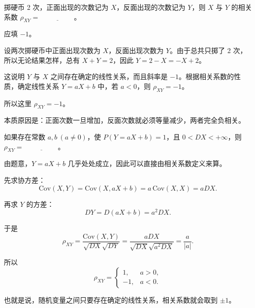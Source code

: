 ﻿\documentclass[lang=cn,11pt]{elegantbook}
\begin{document}
\begin{exercise}\label{exer:4-coin-rho}
掷硬币 2 次，正面出现的次数记为 \(X\)，反面出现的次数记为 \(Y\)，则 \(X\) 与 \(Y\) 的相关系数 \(\rho_{XY} =\,\underline{\hspace{2cm}}\)。
\end{exercise}
\begin{solution}
应填 \(-1\)。

设两次掷硬币中正面出现次数为 \(X\)，反面出现次数为 \(Y\)。由于总共只掷了 2 次，所以无论结果怎样，总有 \(X+Y=2\)，因此 \(Y=2-X=-X+2\)。

这说明 \(Y\) 与 \(X\) 之间存在确定的线性关系，而且斜率是 \(-1\)。根据相关系数的性质，确定线性关系 \(Y=aX+b\) 中，若 \(a<0\)，则 \(\rho_{XY}=-1\)。

所以这里 \(\rho_{XY}=-1\)。

本质原因是：正面次数一旦增加，反面次数就必须等量减少，两者完全负相关。
\end{solution}


\begin{exercise}\label{exer:4-14-linear}
如果存在常数 \(a, b\ (a \neq 0)\)，使 \(P(Y = aX + b) = 1\)，且 \(0 < DX < +\infty\)，则 \(\rho_{XY} =\,\underline{\hspace{2cm}}\)。
\end{exercise}

\begin{solution}
由题意，\(Y=aX+b\) 几乎处处成立，因此可以直接由相关系数定义来算。

先求协方差：
\[
\mathrm{Cov}(X,Y)=\mathrm{Cov}(X,aX+b)=a\,\mathrm{Cov}(X,X)=aDX.
\]

再求 \(Y\) 的方差：
\[
DY=D(aX+b)=a^2DX.
\]

于是
\[
\rho_{XY}
=\frac{\mathrm{Cov}(X,Y)}{\sqrt{DX}\sqrt{DY}}
=\frac{aDX}{\sqrt{DX}\sqrt{a^2DX}}
=\frac{a}{|a|}.
\]

所以
\[
\rho_{XY} = \begin{cases} 1, & a > 0, \\ -1, & a < 0. \end{cases}
\]

也就是说，随机变量之间只要存在确定的线性关系，相关系数就会取到 \(\pm1\)。
\end{solution}
\end{document}
